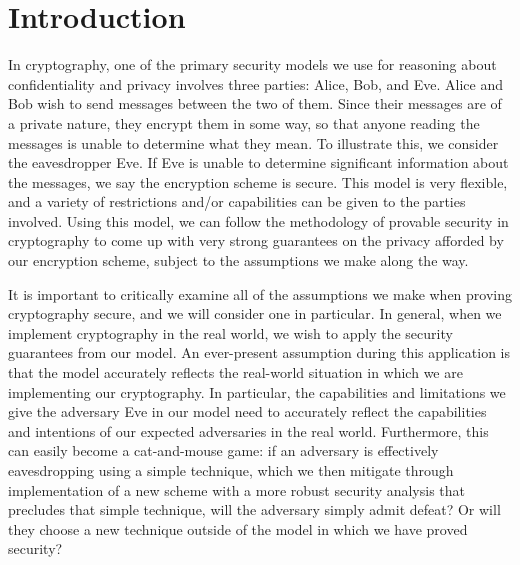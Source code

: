 \chapter{Introduction}

In cryptography, one of the primary security models we use for reasoning about confidentiality and privacy involves three parties: Alice, Bob, and Eve. Alice and Bob wish to send messages between the two of them. Since their messages are of a private nature, they encrypt them in some way, so that anyone reading the messages is unable to determine what they mean. To illustrate this, we consider the eavesdropper Eve. If Eve is unable to determine significant information about the messages, we say the encryption scheme is secure. This model is very flexible, and a variety of restrictions and/or capabilities can be given to the parties involved. Using this model, we can follow the methodology of provable security in cryptography to come up with very strong guarantees on the privacy afforded by our encryption scheme, subject to the assumptions we make along the way.

It is important to critically examine all of the assumptions we make when proving cryptography secure, and we will consider one in particular. In general, when we implement cryptography in the real world, we wish to apply the security guarantees from our model. An ever-present assumption during this application is that the model accurately reflects the real-world situation in which we are implementing our cryptography. In particular, the capabilities and limitations we give the adversary Eve in our model need to accurately reflect the capabilities and intentions of our expected adversaries in the real world. Furthermore, this can easily become a cat-and-mouse game: if an adversary is effectively eavesdropping using a simple technique, which we then mitigate through implementation of a new scheme with a more robust security analysis that precludes that simple technique, will the adversary simply admit defeat? Or will they choose a new technique outside of the model in which we have proved security?

